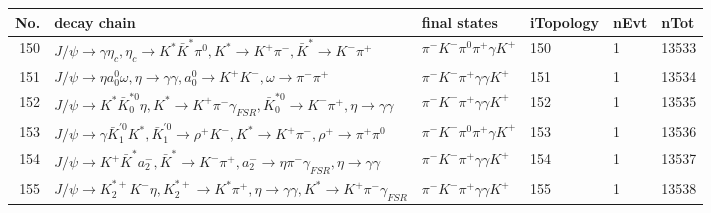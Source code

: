 \begin{table}[htbp] 
\begin{center}
\begin{small}
\begin{tabular}{rlllll}\hline\hline
 No. & decay chain & final states &  iTopology & nEvt & nTot \\\hline
150&$J/\psi       \rightarrow \gamma       \eta_{c}    , \eta_{c}     \rightarrow K^{*}          \bar{K}^{*}   \pi^{0}        , K^{*}           \rightarrow K^{+}          \pi^{-}        , \bar{K}^{*}    \rightarrow K^{-}          \pi^{+}        $&$\pi^{-}        K^{-}          \pi^{0}        \pi^{+}        \gamma       K^{+}          $&  150&    1&13533\\
151&$J/\psi       \rightarrow \eta          a_{0}^{0}      \omega         , \eta           \rightarrow \gamma       \gamma       , a_{0}^{0}       \rightarrow K^{+}          K^{-}          , \omega          \rightarrow \pi^{-}        \pi^{+}        $&$\pi^{-}        K^{-}          \pi^{+}        \gamma       \gamma       K^{+}          $&  151&    1&13534\\
152&$J/\psi       \rightarrow K^{*}          \bar{K}_0^{*0}\eta          , K^{*}           \rightarrow K^{+}          \pi^{-}        \gamma_{FSR} , \bar{K}_0^{*0} \rightarrow K^{-}          \pi^{+}        , \eta           \rightarrow \gamma       \gamma       $&$\pi^{-}        K^{-}          \pi^{+}        \gamma       \gamma       K^{+}          $&  152&    1&13535\\
153&$J/\psi       \rightarrow \gamma       \bar{K}_1^{'0}K^{*}          , \bar{K}_1^{'0} \rightarrow \rho^{+}      K^{-}          , K^{*}           \rightarrow K^{+}          \pi^{-}        , \rho^{+}       \rightarrow \pi^{+}        \pi^{0}        $&$\pi^{-}        K^{-}          \pi^{0}        \pi^{+}        \gamma       K^{+}          $&  153&    1&13536\\
154&$J/\psi       \rightarrow K^{+}          \bar{K}^{*}   a_{2}^{-}      , \bar{K}^{*}    \rightarrow K^{-}          \pi^{+}        , a_{2}^{-}       \rightarrow \eta          \pi^{-}        \gamma_{FSR} , \eta           \rightarrow \gamma       \gamma       $&$\pi^{-}        K^{-}          \pi^{+}        \gamma       \gamma       K^{+}          $&  154&    1&13537\\
155&$J/\psi       \rightarrow K_2^{*+}       K^{-}          \eta          , K_2^{*+}        \rightarrow K^{*}          \pi^{+}        , \eta           \rightarrow \gamma       \gamma       , K^{*}           \rightarrow K^{+}          \pi^{-}        \gamma_{FSR} $&$\pi^{-}        K^{-}          \pi^{+}        \gamma       \gamma       K^{+}          $&  155&    1&13538\\

\end{tabular}
\end{small}
\end{center}
\end{table}
